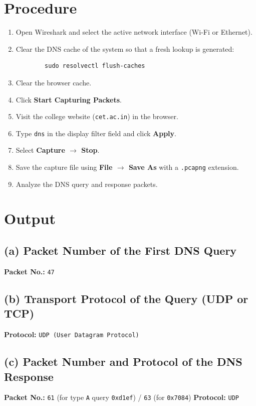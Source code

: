 \documentclass[12pt, a4paper]{report}
\begin{document}
\section*{Procedure}
\begin{enumerate}
	\itemsep 0em
	\item Open Wireshark and select the active network interface (Wi-Fi or Ethernet).
	\item Clear the DNS cache of the system so that a fresh lookup is generated:
	\begin{lstlisting}
		sudo resolvectl flush-caches
	\end{lstlisting}
	\item Clear the browser cache.
	\item Click \textbf{Start Capturing Packets}.
	\item Visit the college website (\texttt{cet.ac.in}) in the browser.
	\item Type \texttt{dns} in the display filter field and click \textbf{Apply}.
	\item Select \textbf{Capture $\rightarrow$ Stop}.
	\item Save the capture file using \textbf{File $\rightarrow$ Save As} with a \texttt{.pcapng} extension.
	\item Analyze the DNS query and response packets.
\end{enumerate}

\section*{Output}

\subsection*{(a) Packet Number of the First DNS Query}
\textbf{Packet No.:} \texttt{47} 

\subsection*{(b) Transport Protocol of the Query (UDP or TCP)}
\textbf{Protocol:} \texttt{UDP (User Datagram Protocol)}

\subsection*{(c) Packet Number and Protocol of the DNS Response}
\textbf{Packet No.:} \texttt{61} (for type \texttt{A} query \texttt{0xd1ef}) / \texttt{63} (for \texttt{0x7084}) \hfill \textbf{Protocol:} \texttt{UDP}
\end{document}
